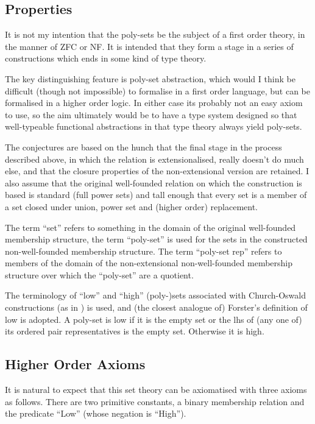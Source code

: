 \documentclass[numreferences]{rbjk}
\begin{document}
\begin{article}
\section{Properties}

It is not my intention that the poly-sets be the subject of a first order theory, in the manner of ZFC or NF.
It is intended that they form a stage in a series of constructions which ends in some kind of type theory.

The key distinguishing feature is poly-set abstraction, which would I think be difficult (though not impossible) to formalise in a first order language, but can be formalised in a higher order logic.
In either case its probably not an easy axiom to use, so the aim ultimately would be to have a type system designed so that well-typeable functional abstractions in that type theory always yield poly-sets.

The conjectures are based on the hunch that the final stage in the process described above, in which the relation is extensionalised, really doesn't do much else, and that the closure properties of the non-extensional version are retained.
I also assume that the original well-founded relation on which the construction is based is standard (full power sets) and tall enough that every set is a member of a set closed under union, power set and (higher order) replacement.

The term ``set'' refers to something in the domain of the original well-founded membership structure, the term ``poly-set'' is used for the sets in the constructed non-well-founded membership structure.
The term ``poly-set rep'' refers to members of the domain of the non-extensional non-well-founded membership structure over which the ``poly-set'' are a quotient. 

The terminology of ``low'' and ``high'' (poly-)sets associated with Church-Oswald constructions (as in \cite{forster92,forster2005}) is used, and (the closest analogue of) Forster's definition of low is adopted.
A poly-set is low if it is the empty set or the lhs of (any one of) its ordered pair representatives is the empty set.
Otherwise it is high.

\subsection{Higher Order Axioms}

It is natural to expect that this set theory can be axiomatised with three axioms as follows.
There are two primitive constants, a binary membership relation and the predicate ``Low'' (whose negation is ``High'').


\end{article}
\end{document}
